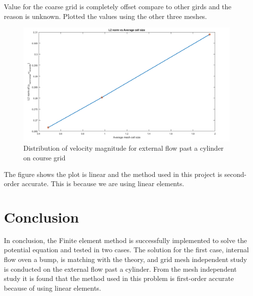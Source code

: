 \documentclass[12pt]{elsarticle}
\begin{document}
	Value for the coarse grid is completely offset compare to other girds and the reason is unknown. Plotted the values using the other three meshes.
	\clearpage
	\begin{figure}[h] \label{comp}
		\centering\includegraphics[width=1.0\linewidth]{comparisio}
		\caption{Distribution of velocity magnitude for external flow past a cylinder on course grid}
	\end{figure}
	The figure shows the plot is linear and the method used in this project is second-order accurate. This is because we are using linear elements.
	
	\section{Conclusion}
	In conclusion, the Finite element method is successfully implemented to solve the potential equation and tested in two cases. The solution for the first case, internal flow oven a bump, is matching with the theory, and grid mesh independent study is conducted on the external flow past a cylinder. From the mesh independent study it is found that the method used in this problem is first-order accurate because of using linear elements.
	
	
	
	
\end{document}
